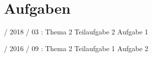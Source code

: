 \documentclass{lehramt-informatik-haupt}
\begin{document}

\chapter{Aufgaben}

 / 2018 / 03 : Thema 2 Teilaufgabe 2 Aufgabe 1

%

 / 2016 / 09 : Thema 2 Teilaufgabe 1 Aufgabe 2

\literatur
\end{document}

